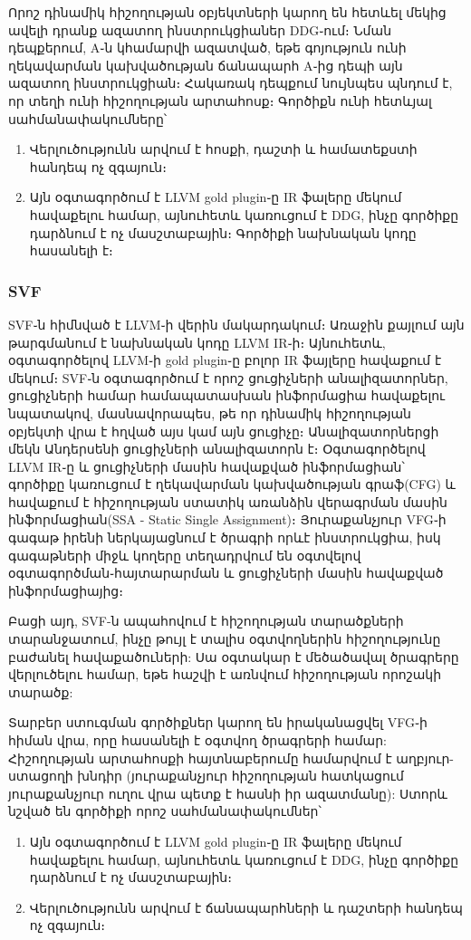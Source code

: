 {        Որոշ դինամիկ հիշողության օբյեկտների կարող են հետևել մեկից ավելի դրանք ազատող ինստրուկցիաներ DDG֊ում։
        Նման դեպքերում, A֊ն կհամարվի ազատված, եթե գոյություն ունի ղեկավարման կախվածության ճանապարհ A֊ից դեպի այն ազատող
        ինստրուկցիան։ Հակառակ դեպքում նույնպես պնդում է, որ տեղի ունի հիշողության արտահոսք։ Գործիքն ունի հետևյալ սահմանափակումները՝
        \begin{enumerate}[itemsep=1mm]
            \item Վերլուծությունն արվում է հոսքի, դաշտի և համատեքստի հանդեպ ոչ զգայուն։
            \item Այն օգտագործում է LLVM gold plugin֊ը IR ֆալերը մեկում հավաքելու համար, այնուհետև կառուցում է DDG, ինչը գործիքը դարձնում է ոչ մասշտաբային։
            Գործիքի նախնական կոդը հասանելի է\cite{PCA}։
        \end{enumerate}

        \subsubsection{SVF}
        SVF\cite{Sui2016}֊ն հիմնված է LLVM֊ի վերին մակարդակում։ Առաջին քայլում այն թարգմանում է նախնական կոդը LLVM IR֊ի։
        Այնուհետև, օգտագործելով LLVM֊ի gold plugin֊ը բոլոր IR ֆայլերը հավաքում է մեկում։ SVF֊ն օգտագործում է որոշ ցուցիչների
        անալիզատորներ, ցուցիչների համար համապատասխան ինֆորմացիա հավաքելու նպատակով, մասնավորապես, թե որ դինամիկ հիշողության
        օբյեկտի վրա է հղված այս կամ այն ցուցիչը։ Անալիզատորներցի մեկն Անդերսենի ցուցիչների անալիզատորն է\cite{Andersen}։
        Օգտագործելով LLVM IR֊ը և ցուցիչների մասին հավաքված ինֆորմացիան՝ գործիքը կառուցում է ղեկավարման կախվածության գրաֆ(CFG)
        և հավաքում է հիշողության ստատիկ առանձին վերագրման մասին ինֆորմացիան(SSA - Static Single Assignment)։
        Յուրաքանչյուր VFG֊ի գագաթ իրենի ներկայացնում է ծրագրի որևէ ինստրուկցիա, իսկ գագաթների միջև կողերը տեղադրվում են
        օգտվելով օգտագործման֊հայտարարման և ցուցիչների մասին հավաքված ինֆորմացիայից։

        Բացի այդ, SVF-ն ապահովում է հիշողության տարածքների տարանջատում, ինչը թույլ է տալիս օգտվողներին հիշողությունը բաժանել
        հավաքածուների: Սա օգտակար է մեծածավալ ծրագրերը վերլուծելու համար, եթե հաշվի է առնվում հիշողության որոշակի տարածք:

        Տարբեր ստուգման գործիքներ կարող են իրականացվել VFG֊ի հիման վրա, որը հասանելի է օգտվող ծրագրերի համար:
        Հիշողության արտահոսքի հայտնաբերումը համարվում է աղբյուր-ստացողի խնդիր (յուրաքանչյուր հիշողության հատկացում
        յուրաքանչյուր ուղու վրա պետք է հասնի իր ազատմանը): Ստորև նշված են գործիքի որոշ սահմանափակումներ՝
        \begin{enumerate}[itemsep=1mm]
            \item Այն օգտագործում է LLVM gold plugin֊ը IR ֆալերը մեկում հավաքելու համար, այնուհետև կառուցում է DDG,
            ինչը գործիքը դարձնում է ոչ մասշտաբային։
            \item Վերլուծությունն արվում է ճանապարհների և դաշտերի հանդեպ ոչ զգայուն։
        \end{enumerate}
    }
